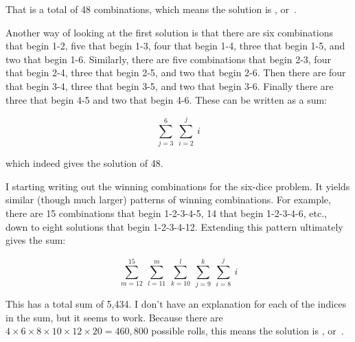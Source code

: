 \documentclass{article}
\begin{document}
That is a total of 48 combinations, which means the solution is , or
\,.

Another way of looking at the first solution is that there are six combinations that begin 1-2, five that begin 1-3, four that begin 1-4, three that begin 1-5, and two that begin 1-6.
Similarly, there are five combinations that begin 2-3, four that begin 2-4, three that begin 2-5, and two that begin 2-6.
Then there are four that begin 3-4, three that begin 3-5, and two that begin 3-6.
Finally there are three that begin 4-5 and two that begin 4-6.
These can be written as a sum:

\[
\sum_{j=3}^{6}\ \sum_{i=2}^{j}\ i
\]

which indeed gives the solution of 48.

I starting writing out the winning combinations for the six-dice problem.
It yields similar (though much larger) patterns of winning combinations.
For example, there are 15 combinations that begin 1-2-3-4-5, 14 that begin 1-2-3-4-6, etc., down to eight solutions that begin 1-2-3-4-12.
Extending this pattern ultimately gives the sum:

\[
\sum_{m=12}^{15}\ \sum_{l=11}^{m}\ \sum_{k=10}^{l}\ \sum_{j=9}^{k}\ \sum_{i=8}^{j}\ i
\]

This has a total sum of 5,434.
I don't have an explanation for each of the indices in the sum, but it seems to work.
Because there are $4\times6\times8\times10\times12\times20=460{,}800$ possible rolls, this means the solution is , or
\,.
\end{document}
